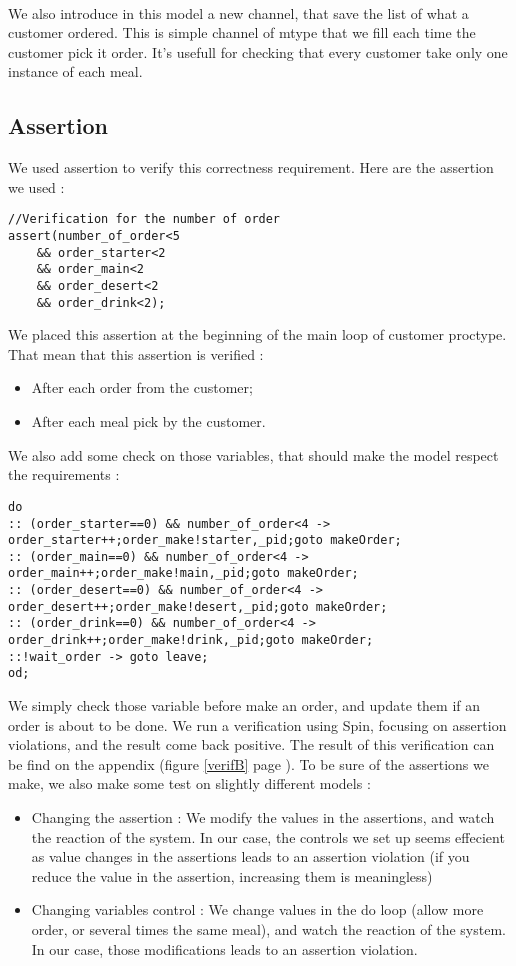 \documentclass[a4paper,11pt]{article} %
\begin{document}
\paragraph{}We also introduce in this model a new channel, that save the list of what a customer ordered. This is simple channel of mtype that we fill each time the customer pick it order. It's usefull for checking that every customer take only one instance of each meal.
\subsection{Assertion}
We used assertion to verify this correctness requirement.
Here are the assertion we used : 
\begin{lstlisting}
//Verification for the number of order
assert(number_of_order<5 
	&& order_starter<2 
	&& order_main<2
	&& order_desert<2
	&& order_drink<2);
\end{lstlisting}
We placed this assertion at the beginning of the main loop of customer proctype. That mean that this assertion is verified : 
\begin{itemize}
\item After each order from the customer;
\item After each meal pick by the customer.
\end{itemize}
We also add some check on those variables, that should make the model respect the requirements : 
\begin{lstlisting}
do
:: (order_starter==0) && number_of_order<4 -> order_starter++;order_make!starter,_pid;goto makeOrder;
:: (order_main==0) && number_of_order<4 -> order_main++;order_make!main,_pid;goto makeOrder;
:: (order_desert==0) && number_of_order<4 -> order_desert++;order_make!desert,_pid;goto makeOrder;
:: (order_drink==0) && number_of_order<4 -> order_drink++;order_make!drink,_pid;goto makeOrder;
::!wait_order -> goto leave;
od;
\end{lstlisting}
We simply check those variable before make an order, and update them if an order is about to be done.
We run a verification using Spin, focusing on assertion violations, and the result come back positive. The result of this verification can be find on the appendix (figure \ref{verifB} page \pageref{verifB}). To be sure of the assertions we make, we also make some test on slightly different models : 
\begin{itemize}
\item Changing the assertion : We modify the values in the assertions, and watch the reaction of the system. In our case, the controls we set up seems effecient as value changes in the assertions leads to an assertion violation (if you reduce the value in the assertion, increasing them is meaningless)
\item Changing variables control : We change values in the do loop (allow more order, or several times the same meal), and watch the reaction of the system. In our case, those modifications leads to an assertion violation.
\end{itemize}
\end{document}

